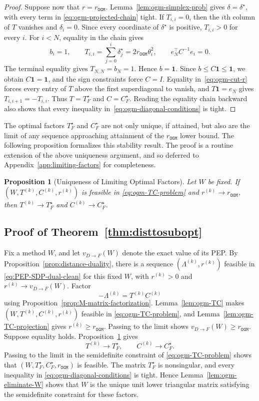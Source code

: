\documentclass[11pt]{article}
\newtheorem{proposition}[thm]{Proposition}
\begin{document}
\begin{proof}
Suppose now that $r=r_\mathtt{OGM}$.
Lemma~\ref{lem:ogm-simplex-prob} gives
$\delta=\delta^\star$, with every term in
\eqref{eq:ogm-projected-chain} tight. If $T_{i,i}=0$, then the $i$th
column of $T$ vanishes and $\delta_i=0$. Since every coordinate of
$\delta^\star$ is positive, $T_{i,i}>0$ for every $i$. For $i<N$,
equality in the chain gives
\[
    b_i=1,
    \qquad
    T_{i,i}=\sum_{j=0}^i\delta_j^\star
    =2r_\mathtt{OGM}\theta_i^2,
    \qquad
    e_N^\top C^{-1}e_i=0.
\]
The terminal equality gives $T_{N,N}=b_N=1$. Hence $b=\mathbf1$.
Since $b\leq C\mathbf1\leq\mathbf1$, we obtain
$C\mathbf1=\mathbf1$, and the sign constraints force $C=I$.
Equality in~\eqref{eq:ogm-cut-r} forces every entry of $T$ above the first
superdiagonal to vanish, and $T\mathbf1=e_N$ gives
$T_{i,i+1}=-T_{i,i}$. Thus $T=T_F^\star$ and $C=C_F^\star$.
Reading the equality chain backward also shows that every inequality
in~\eqref{eq:ogm-diagonal-conditions} is tight.
\end{proof}

The optimal factors $T_F^\star$ and $C_F^\star$ are not only unique, if attained, but also are the limit of any sequence approaching attainment of the $r_\mathtt{OGM}$ lower bound. The following proposition formalizes this stability result. The proof is a routine extension of the above uniqueness argument, and so deferred to Appendix~\ref{app:limiting-factors} for completeness.
\begin{proposition}[Uniqueness of Limiting Optimal Factors]
\label{prop:ogm-limiting-factors}
Let $W$ be fixed. If $(W,T^{(k)},C^{(k)},r^{(k)})$ is feasible in
\eqref{eq:ogm-TC-problem} and $r^{(k)}\to r_\mathtt{OGM}$, then $T^{(k)}\to T_F^\star$ and $C^{(k)}\to C_F^\star$.
\end{proposition}


\subsection{Proof of Theorem~\ref{thm:disttosubopt}}
Fix a method $W$, and let $v_{D\rightarrow F}(W)$ denote the exact value of its PEP. By
Proposition~\ref{prop:distance-duality}, there is a sequence
$(\Lambda^{(k)},r^{(k)})$ feasible in
\eqref{eq:PEP-SDP-dual-clean} for this fixed $W$, with $r^{(k)}>0$ and
$r^{(k)}\to v_{D\rightarrow F}(W)$. Factor
\[
    -\Lambda^{(k)}=T^{(k)}C^{(k)}
\]
using Proposition~\ref{prop:M-matrix-factorization}.
Lemma~\ref{lem:ogm-TC} makes
$(W,T^{(k)},C^{(k)},r^{(k)})$ feasible in
\eqref{eq:ogm-TC-problem}, and
Lemma~\ref{lem:ogm-TC-projection} gives
$r^{(k)}\geq r_\mathtt{OGM}$. Passing to the limit shows $v_{D\rightarrow F}(W)\geq r_\mathtt{OGM}$. Suppose equality holds. Proposition~\ref{prop:ogm-limiting-factors} gives
\[
    T^{(k)}\to T_F^\star,
    \qquad
    C^{(k)}\to C_F^\star.
\]
Passing to the limit in the semidefinite constraint of
\eqref{eq:ogm-TC-problem} shows that
$(W,T_F^\star,C_F^\star,r_\mathtt{OGM})$ is feasible. The matrix
$T_F^\star$ is nonsingular, and every inequality in
\eqref{eq:ogm-diagonal-conditions} is tight. Hence
Lemma~\ref{lem:ogm-eliminate-W} shows that $W$ is the unique unit lower
triangular matrix satisfying the semidefinite constraint for these
factors.
\end{document}
